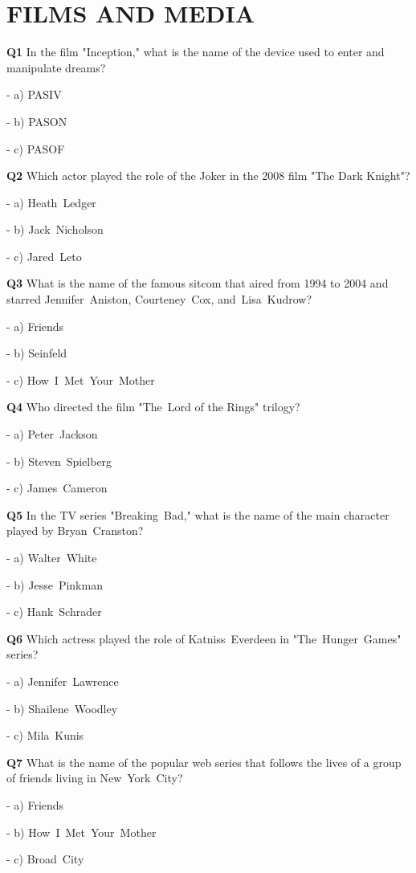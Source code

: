 \section{FILMS AND MEDIA}

\textbf{Q1} In the film "Inception," what is the name of the device used to enter and manipulate dreams?\par
\quad - a) PASIV\par
\quad - b) PASON\par
\quad - c) PASOF\par

\textbf{Q2} Which actor played the role of the Joker in the 2008 film "The Dark Knight"?\par
\quad - a) Heath Ledger\par
\quad - b) Jack Nicholson\par
\quad - c) Jared Leto\par

\textbf{Q3} What is the name of the famous sitcom that aired from 1994 to 2004 and starred Jennifer Aniston, Courteney Cox, and Lisa Kudrow?\par
\quad - a) Friends\par
\quad - b) Seinfeld\par
\quad - c) How I Met Your Mother\par

\textbf{Q4} Who directed the film "The Lord of the Rings" trilogy?\par
\quad - a) Peter Jackson\par
\quad - b) Steven Spielberg\par
\quad - c) James Cameron\par

\textbf{Q5} In the TV series "Breaking Bad," what is the name of the main character played by Bryan Cranston?\par
\quad - a) Walter White\par
\quad - b) Jesse Pinkman\par
\quad - c) Hank Schrader\par

\textbf{Q6} Which actress played the role of Katniss Everdeen in "The Hunger Games" series?\par
\quad - a) Jennifer Lawrence\par
\quad - b) Shailene Woodley\par
\quad - c) Mila Kunis\par

\textbf{Q7} What is the name of the popular web series that follows the lives of a group of friends living in New York City?\par
\quad - a) Friends\par
\quad - b) How I Met Your Mother\par
\quad - c) Broad City\par


